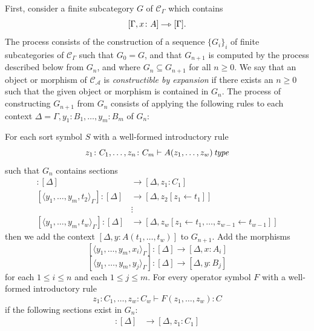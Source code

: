 First, consider a finite subcategory $G$ of $\mathcal{C}_\Gamma$ which 
contains \[
    [\Gamma, x \colon A] \openrightarrow [\Gamma].
\]
The process consists of the construction of a sequence $\{ G_i\}_i$
of finite subcategories of $\mathcal{C}_\Gamma$ such that $G_0 = G$,
and that $G_{n+1}$ is computed by the process described below
from $G_n$, and where $G_n \subseteq G_{n+1}$ for all $n \geq 0$.
We say that an object or morphism of $\mathcal{C_A}$ is \textit{constructible by expansion}
if there exists an $n \geq 0$ such that the given object or morphism 
is contained in $G_n$. 
The process of constructing $G_{n+1}$ from $G_n$ consists of applying
the following rules to each context 
$\Delta = \Gamma, y_1 \colon B_1, \dots, y_m \colon B_m$
of $G_n$:
\begin{itemize}
     For each sort symbol $S$ with a well-formed
        introductory rule \[
            z_1 \colon C_1, \dots, z_n \colon C_m \vdash A(z_1, \dots, z_w) \operatorname{\mathit{\space type}}
        \]
        such that $G_n$ contains sections
        \begin{align*}
            [\langle y_1, \dots, y_m, t_1 \rangle_\Gamma] \colon [\Delta] &\to [\Delta, z_1 \colon C_1] \\
            [\langle y_1, \dots, y_m, t_2 \rangle_\Gamma] \colon [\Delta] &\to [\Delta, z_2[z_1 \leftarrow t_1]] \\
            &\vdots \\
            [\langle y_1, \dots, y_m, t_w \rangle_\Gamma] \colon [\Delta] &\to [\Delta, z_w[z_1 \leftarrow t_1, \dots, z_{w-1} \leftarrow t_{w-1}]]
        \end{align*}
        then we add the context
        $[\Delta, y \colon A(t_1, \dots, t_w)]$ to $G_{n+1}$.
     Add the morphisms 
        \[
            [\langle y_1, \dots, y_m, x_i \rangle_\Gamma] \colon [\Delta] \to [\Delta, x \colon A_i]
        \] \[
            [\langle y_1, \dots, y_m, y_j \rangle_\Gamma] \colon [\Delta] \to [\Delta, y \colon B_j]
        \]
        for each $1 \leq i \leq n$ and each $1 \leq j \leq m$.
     For every operator symbol $F$ with a well-formed
        introductory rule \[
            z_1 \colon C_1, \dots, z_w \colon C_w \vdash F(z_1, \dots, z_w) \colon C
        \]
        if the following sections exist in $G_n$:
        \begin{align*}
            [\langle y_1, \dots, y_m, t_1 \rangle_\Gamma] \colon [\Delta] &\to [\Delta, z_1 \colon C_1] \\

\end{align*}
\end{itemize}

